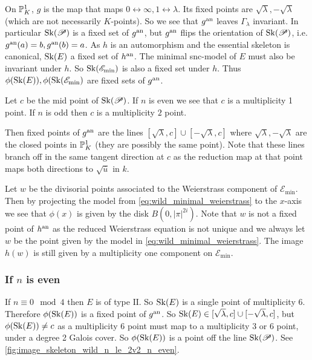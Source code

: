 On $\mathbb{P}^{1}_K$, $g$ is the map that maps $0 \leftrightarrow \infty, 1 \leftrightarrow \lambda$. 
Its fixed points are $\sqrt{\lambda}, -\sqrt{\lambda}$ (which are not necessarily $K$-points).
So we see that $g{}^{\text{an}}$ leaves $\Gamma_\lambda$ invariant. In particular $\operatorname{Sk}(\mathscr P)$ is a fixed set of $g{}^{\text{an}}$, but $g{}^{\text{an}}$ flips the orientation of $\operatorname{Sk}(\mathscr P)$, i.e. $g{}^{\text{an}}(a) = b, g{}^{\text{an}}(b) = a$. 
As $h$ is an automorphism and the essential skeleton is canonical, $\operatorname{Sk}(E)$ a fixed set of $h{}^{\text{an}}$. 
The minimal snc-model of $E$ must also be invariant under $h$. 
So $\operatorname{Sk}(\mathscr E_\text{min} )$ is also a fixed set under $h$. 
Thus $\phi(\sk(E)), \phi(\sk(\mathscr E_\text{min} )$ are fixed sets of $g{}^{\text{an}}$.


Let $c$ be the mid point of $\operatorname{Sk}(\mathscr P)$. 
If $n$ is even we see that $c$ is a multiplicity 1 point. 
If $n$ is odd then $c$ is a multiplicity $2$ point. 

Then fixed points of $g{}^{\text{an}}$ are the lines  $[\sqrt{\lambda}, c] \cup [-\sqrt{\lambda} , c]$ where $\sqrt{\lambda}, -\sqrt{\lambda}$ are the closed points in $\mathbb{P}^{1}_K$ (they are possibly the same point). 
Note that these lines branch off in the same tangent direction at $c$ as the reduction map at that point maps both directions to  $\sqrt{\overline{u}} $ in $k$. 

Let $w$ be the divisorial points associated to the Weierstrass component of $\mathscr E_\text{min} $. 
Then by projecting the model from \cref{eq:wild_minimal_weierstrass} to the $x$-axis we see that $\phi(x)$ is given by the disk $B(0, |\pi|^{2i})$. 
Note that $w$ is not a fixed point of $h{}^{\text{an}}$ as the reduced Weierstrass equation is not unique and we always let $w$ be the point given by the model in \cref{eq:wild_minimal_weierstrass}. 
The image $h(w)$ is still given by a multiplicity one component on $\mathscr E_\text{min} $.

\subsubsection{If $n$ is even} \label{sec:if_$n$_is_even}

If  $n \equiv 0 \mod 4$ then $E$ is of type $\mathrm{II}$.  
So $\operatorname{Sk}(E)$ is a single point of multiplicity 6. 
Therefore  $\phi(\sk(E))$ is a fixed point of $g{}^{\text{an}}$. 
So $\operatorname{Sk}(E) \in [\sqrt{\lambda}, c] \cup [-\sqrt{\lambda}, c] $, but $\phi(\sk(E)) \ne c$ as a multiplicity 6 point must map to a multiplicity 3 or 6 point, under a degree 2 Galois cover. 
So $\phi(\sk(E))$ is a point off the line $\operatorname{Sk}(\mathscr P)$. 
See \cref{fig:image_skeleton_wild_n_le_2v2_n_even}. 

